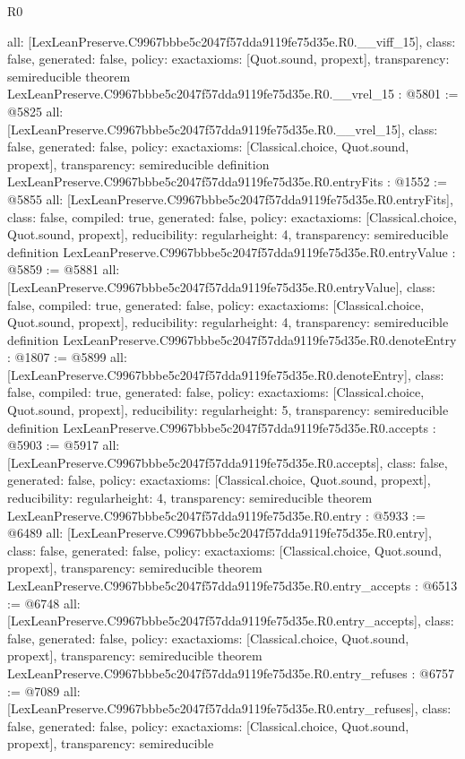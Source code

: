 \begin{lexlean}{R0}
\begin{coremodule}
{  all: [LexLeanPreserve.C9967bbbe5c2047f57dda9119fe75d35e.R0.__viff_15],
  class: false,
  generated: false,
  policy: exact{axioms: [Quot.sound, propext]},
  transparency: semireducible
}
theorem LexLeanPreserve.C9967bbbe5c2047f57dda9119fe75d35e.R0.__vrel_15 : @5801 := @5825 {
  all: [LexLeanPreserve.C9967bbbe5c2047f57dda9119fe75d35e.R0.__vrel_15],
  class: false,
  generated: false,
  policy: exact{axioms: [Classical.choice, Quot.sound, propext]},
  transparency: semireducible
}
definition LexLeanPreserve.C9967bbbe5c2047f57dda9119fe75d35e.R0.entryFits : @1552 := @5855 {
  all: [LexLeanPreserve.C9967bbbe5c2047f57dda9119fe75d35e.R0.entryFits],
  class: false,
  compiled: true,
  generated: false,
  policy: exact{axioms: [Classical.choice, Quot.sound, propext]},
  reducibility: regular{height: 4},
  transparency: semireducible
}
definition LexLeanPreserve.C9967bbbe5c2047f57dda9119fe75d35e.R0.entryValue : @5859 := @5881 {
  all: [LexLeanPreserve.C9967bbbe5c2047f57dda9119fe75d35e.R0.entryValue],
  class: false,
  compiled: true,
  generated: false,
  policy: exact{axioms: [Classical.choice, Quot.sound, propext]},
  reducibility: regular{height: 4},
  transparency: semireducible
}
definition LexLeanPreserve.C9967bbbe5c2047f57dda9119fe75d35e.R0.denoteEntry : @1807 := @5899 {
  all: [LexLeanPreserve.C9967bbbe5c2047f57dda9119fe75d35e.R0.denoteEntry],
  class: false,
  compiled: true,
  generated: false,
  policy: exact{axioms: [Classical.choice, Quot.sound, propext]},
  reducibility: regular{height: 5},
  transparency: semireducible
}
definition LexLeanPreserve.C9967bbbe5c2047f57dda9119fe75d35e.R0.accepts : @5903 := @5917 {
  all: [LexLeanPreserve.C9967bbbe5c2047f57dda9119fe75d35e.R0.accepts],
  class: false,
  generated: false,
  policy: exact{axioms: [Classical.choice, Quot.sound, propext]},
  reducibility: regular{height: 4},
  transparency: semireducible
}
theorem LexLeanPreserve.C9967bbbe5c2047f57dda9119fe75d35e.R0.entry : @5933 := @6489 {
  all: [LexLeanPreserve.C9967bbbe5c2047f57dda9119fe75d35e.R0.entry],
  class: false,
  generated: false,
  policy: exact{axioms: [Classical.choice, Quot.sound, propext]},
  transparency: semireducible
}
theorem LexLeanPreserve.C9967bbbe5c2047f57dda9119fe75d35e.R0.entry_accepts : @6513 := @6748 {
  all: [LexLeanPreserve.C9967bbbe5c2047f57dda9119fe75d35e.R0.entry_accepts],
  class: false,
  generated: false,
  policy: exact{axioms: [Classical.choice, Quot.sound, propext]},
  transparency: semireducible
}
theorem LexLeanPreserve.C9967bbbe5c2047f57dda9119fe75d35e.R0.entry_refuses : @6757 := @7089 {
  all: [LexLeanPreserve.C9967bbbe5c2047f57dda9119fe75d35e.R0.entry_refuses],
  class: false,
  generated: false,
  policy: exact{axioms: [Classical.choice, Quot.sound, propext]},
  transparency: semireducible
}


\end{coremodule}
\end{lexlean}
